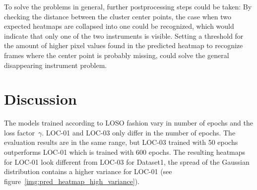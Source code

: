 To solve the problems in general, further postprocessing steps could be taken:
By checking the distance between the cluster center points, the case when two expected heatmaps are collapsed into one could be recognized, which would indicate that only one of the two instruments is visible.
Setting a threshold for the amount of higher pixel values found in the predicted heatmap to recognize frames where the center point is probably missing, could solve the general disappearing instrument problem.

\section{Discussion}
The models trained according to LOSO fashion vary in number of epochs and the loss factor~$\gamma$.
LOC-01 and LOC-03 only differ in the number of epochs. The evaluation results are in the same range, but LOC-03 trained with 50 epochs outperforms LOC-01 which is trained with 600 epochs. 
The resulting heatmaps for LOC-01 look different from LOC-03 for Dataset1, the spread of the Gaussian distribution contains a higher variance for LOC-01 (see figure~\ref{img:pred_heatmap_high_variance}).

